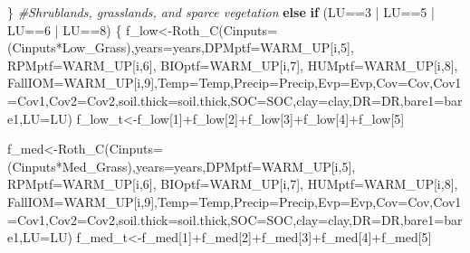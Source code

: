 \documentclass[
  10pt,
  b5paper,
]{book}
\newenvironment{Shaded}{\begin{snugshade}}{\end{snugshade}}
\newcommand{\AttributeTok}[1]{\textcolor[rgb]{0.77,0.63,0.00}{#1}}
\newcommand{\CommentTok}[1]{\textcolor[rgb]{0.56,0.35,0.01}{\textit{#1}}}
\newcommand{\ControlFlowTok}[1]{\textcolor[rgb]{0.13,0.29,0.53}{\textbf{#1}}}
\newcommand{\DecValTok}[1]{\textcolor[rgb]{0.00,0.00,0.81}{#1}}
\newcommand{\FunctionTok}[1]{\textcolor[rgb]{0.00,0.00,0.00}{#1}}
\newcommand{\NormalTok}[1]{#1}
\newcommand{\OtherTok}[1]{\textcolor[rgb]{0.56,0.35,0.01}{#1}}
\newcommand{\SpecialCharTok}[1]{\textcolor[rgb]{0.00,0.00,0.00}{#1}}
\begin{document}
\begin{Shaded}
\begin{Highlighting}[]
\NormalTok{\}}
\CommentTok{\#Shrublands, grasslands, and sparce vegetation}
\ControlFlowTok{else} \ControlFlowTok{if}\NormalTok{ (LU}\SpecialCharTok{==}\DecValTok{3} \SpecialCharTok{|}\NormalTok{ LU}\SpecialCharTok{==}\DecValTok{5} \SpecialCharTok{|}\NormalTok{ LU}\SpecialCharTok{==}\DecValTok{6} \SpecialCharTok{|}\NormalTok{ LU}\SpecialCharTok{==}\DecValTok{8}\NormalTok{) \{}
\NormalTok{f\_low}\OtherTok{\textless{}{-}}\FunctionTok{Roth\_C}\NormalTok{(}\AttributeTok{Cinputs=}\NormalTok{(Cinputs}\SpecialCharTok{*}\NormalTok{Low\_Grass),}\AttributeTok{years=}\NormalTok{years,}\AttributeTok{DPMptf=}\NormalTok{WARM\_UP[i,}\DecValTok{5}\NormalTok{], }\AttributeTok{RPMptf=}\NormalTok{WARM\_UP[i,}\DecValTok{6}\NormalTok{], }\AttributeTok{BIOptf=}\NormalTok{WARM\_UP[i,}\DecValTok{7}\NormalTok{], }\AttributeTok{HUMptf=}\NormalTok{WARM\_UP[i,}\DecValTok{8}\NormalTok{], }\AttributeTok{FallIOM=}\NormalTok{WARM\_UP[i,}\DecValTok{9}\NormalTok{],}\AttributeTok{Temp=}\NormalTok{Temp,}\AttributeTok{Precip=}\NormalTok{Precip,}\AttributeTok{Evp=}\NormalTok{Evp,}\AttributeTok{Cov=}\NormalTok{Cov,}\AttributeTok{Cov1=}\NormalTok{Cov1,}\AttributeTok{Cov2=}\NormalTok{Cov2,}\AttributeTok{soil.thick=}\NormalTok{soil.thick,}\AttributeTok{SOC=}\NormalTok{SOC,}\AttributeTok{clay=}\NormalTok{clay,}\AttributeTok{DR=}\NormalTok{DR,}\AttributeTok{bare1=}\NormalTok{bare1,}\AttributeTok{LU=}\NormalTok{LU)}
\NormalTok{f\_low\_t}\OtherTok{\textless{}{-}}\NormalTok{f\_low[}\DecValTok{1}\NormalTok{]}\SpecialCharTok{+}\NormalTok{f\_low[}\DecValTok{2}\NormalTok{]}\SpecialCharTok{+}\NormalTok{f\_low[}\DecValTok{3}\NormalTok{]}\SpecialCharTok{+}\NormalTok{f\_low[}\DecValTok{4}\NormalTok{]}\SpecialCharTok{+}\NormalTok{f\_low[}\DecValTok{5}\NormalTok{]}

\NormalTok{f\_med}\OtherTok{\textless{}{-}}\FunctionTok{Roth\_C}\NormalTok{(}\AttributeTok{Cinputs=}\NormalTok{(Cinputs}\SpecialCharTok{*}\NormalTok{Med\_Grass),}\AttributeTok{years=}\NormalTok{years,}\AttributeTok{DPMptf=}\NormalTok{WARM\_UP[i,}\DecValTok{5}\NormalTok{], }\AttributeTok{RPMptf=}\NormalTok{WARM\_UP[i,}\DecValTok{6}\NormalTok{], }\AttributeTok{BIOptf=}\NormalTok{WARM\_UP[i,}\DecValTok{7}\NormalTok{], }\AttributeTok{HUMptf=}\NormalTok{WARM\_UP[i,}\DecValTok{8}\NormalTok{], }\AttributeTok{FallIOM=}\NormalTok{WARM\_UP[i,}\DecValTok{9}\NormalTok{],}\AttributeTok{Temp=}\NormalTok{Temp,}\AttributeTok{Precip=}\NormalTok{Precip,}\AttributeTok{Evp=}\NormalTok{Evp,}\AttributeTok{Cov=}\NormalTok{Cov,}\AttributeTok{Cov1=}\NormalTok{Cov1,}\AttributeTok{Cov2=}\NormalTok{Cov2,}\AttributeTok{soil.thick=}\NormalTok{soil.thick,}\AttributeTok{SOC=}\NormalTok{SOC,}\AttributeTok{clay=}\NormalTok{clay,}\AttributeTok{DR=}\NormalTok{DR,}\AttributeTok{bare1=}\NormalTok{bare1,}\AttributeTok{LU=}\NormalTok{LU)}
\NormalTok{f\_med\_t}\OtherTok{\textless{}{-}}\NormalTok{f\_med[}\DecValTok{1}\NormalTok{]}\SpecialCharTok{+}\NormalTok{f\_med[}\DecValTok{2}\NormalTok{]}\SpecialCharTok{+}\NormalTok{f\_med[}\DecValTok{3}\NormalTok{]}\SpecialCharTok{+}\NormalTok{f\_med[}\DecValTok{4}\NormalTok{]}\SpecialCharTok{+}\NormalTok{f\_med[}\DecValTok{5}\NormalTok{]}


\end{Highlighting}
\end{Shaded}
\end{document}
